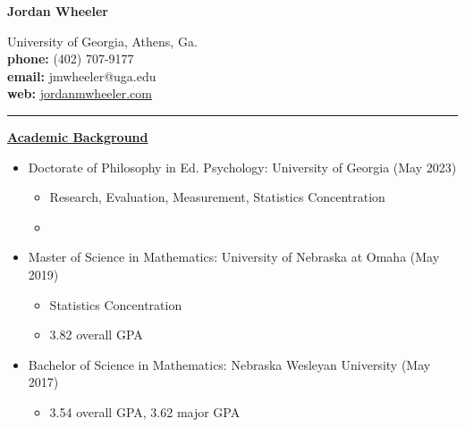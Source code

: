 \documentclass[10pt]{article}
\begin{document}

\begin{center}
\begin{Large}
\textbf{Jordan Wheeler}\\
\end{Large}
{University of Georgia, Athens, Ga.}\\
\textbf{phone:} (402) 707-9177\\
\textbf{email:} jmwheeler@uga.edu\\
\textbf{web:} \href{http://www.jordanmwheeler.com}{jordanmwheeler.com}\\
\noindent\rule{13cm}{0.4pt}
\end{center}


\underline{\textbf{Academic Background}}

\renewcommand\labelitemii{$\circ$}
\renewcommand\labelitemiii{\tiny$\blacksquare$}
\begin{itemize}
\item Doctorate of Philosophy in Ed. Psychology: University of Georgia (May 2023)
\begin{itemize}
\item Research, Evaluation, Measurement, Statistics Concentration
\item 
\end{itemize}
\item Master of Science in Mathematics: University of Nebraska at Omaha (May 2019)
\begin{itemize}
\item Statistics Concentration
\item 3.82 overall GPA 
\end{itemize}
\item Bachelor of Science in Mathematics: Nebraska Wesleyan University (May 2017)
\begin{itemize}
\item 3.54 overall GPA, 3.62 major GPA
\end{itemize}
\end{itemize}
\text{}\\
\end{document}
